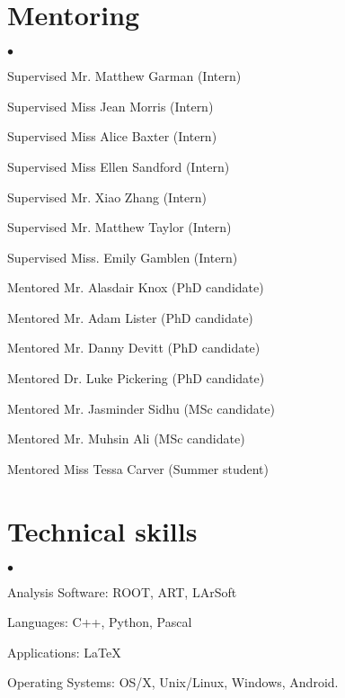 \documentclass[margin,line]{res}
\newenvironment{list2}{
  \begin{list}{$\bullet$}{%
      \setlength{\itemsep}{0in}
      \setlength{\parsep}{0in} \setlength{\parskip}{0in}
      \setlength{\topsep}{0in} \setlength{\partopsep}{0in} 
      \setlength{\leftmargin}{0.2in}}}{\end{list}}
\begin{document}
\begin{resume}
\section{\sc Mentoring }
\begin{list2}
\item Supervised Mr. Matthew Garman (Intern)
\item Supervised Miss Jean Morris (Intern)
\item Supervised Miss Alice Baxter (Intern)
\item Supervised Miss Ellen Sandford (Intern)
\item Supervised Mr. Xiao Zhang (Intern)
\item Supervised Mr. Matthew Taylor (Intern)
\item Supervised Miss. Emily Gamblen (Intern)
\item Mentored Mr. Alasdair Knox (PhD candidate)
\item Mentored Mr. Adam Lister (PhD candidate)
\item Mentored Mr. Danny Devitt (PhD candidate)
\item Mentored Dr. Luke Pickering (PhD candidate)
\item Mentored Mr. Jasminder Sidhu (MSc candidate)
\item Mentored Mr. Muhsin Ali (MSc candidate)
\item Mentored Miss Tessa Carver (Summer student)
\end{list2}


\section{\sc Technical skills} 
\begin{list2}
\item Analysis Software: ROOT, ART, LArSoft
\item Languages: C++, Python, Pascal
\item Applications:  \LaTeX
\item Operating Systems:  OS/X, Unix/Linux, Windows, Android.
\end{list2}



\end{resume}
\end{document}

